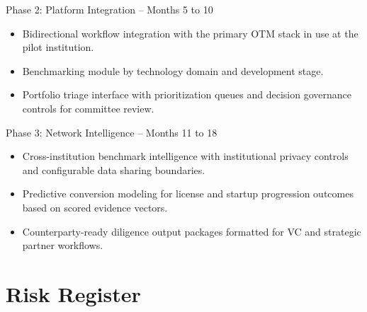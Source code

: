 \documentclass[11pt]{article}
\begin{document}
\vspace{10pt}

\begin{phasebox}{Phase 2: Platform Integration \normalfont\textcolor{midgray}{\small -- Months 5 to 10}}
\begin{itemize}
  \item Bidirectional workflow integration with the primary OTM stack in use at
        the pilot institution.
  \item Benchmarking module by technology domain and development stage.
  \item Portfolio triage interface with prioritization queues and decision
        governance controls for committee review.
\end{itemize}
\end{phasebox}

\vspace{10pt}

\begin{phasebox}{Phase 3: Network Intelligence \normalfont\textcolor{midgray}{\small -- Months 11 to 18}}
\begin{itemize}
  \item Cross-institution benchmark intelligence with institutional privacy
        controls and configurable data sharing boundaries.
  \item Predictive conversion modeling for license and startup progression
        outcomes based on scored evidence vectors.
  \item Counterparty-ready diligence output packages formatted for VC and
        strategic partner workflows.
\end{itemize}
\end{phasebox}

\section{Risk Register}

\vspace{4pt}
\end{document}
